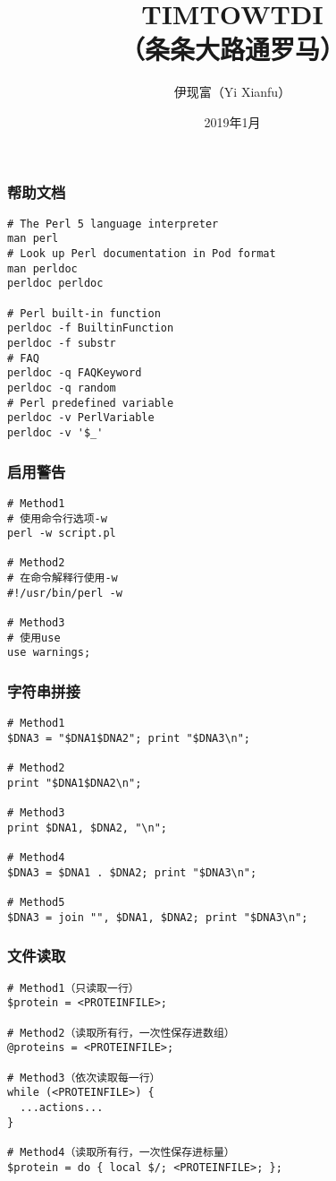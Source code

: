 


\title[TIMTOWTDI]{TIMTOWTDI\\（条条大路通罗马）}
\author[Yixf]{伊现富（Yi Xianfu）}
\date{2019年1月}

%
\begin{frame}
  \titlepage
\end{frame}

\begin{frame}[fragile]
  \frametitle{帮助文档}
  \vspace{-1.5em}
\begin{lstlisting}
# The Perl 5 language interpreter
man perl
# Look up Perl documentation in Pod format
man perldoc
perldoc perldoc

# Perl built-in function
perldoc -f BuiltinFunction
perldoc -f substr
# FAQ
perldoc -q FAQKeyword
perldoc -q random
# Perl predefined variable
perldoc -v PerlVariable
perldoc -v '$_'
\end{lstlisting}
\end{frame}

\begin{frame}[fragile]
  \frametitle{启用警告}
  \vspace{-1.5em}
\begin{lstlisting}
# Method1
# 使用命令行选项-w
perl -w script.pl

# Method2
# 在命令解释行使用-w
#!/usr/bin/perl -w

# Method3
# 使用use
use warnings;
\end{lstlisting}
\end{frame}

\begin{frame}[fragile]
  \frametitle{字符串拼接}
  \vspace{-1.5em}
\begin{lstlisting}
# Method1
$DNA3 = "$DNA1$DNA2"; print "$DNA3\n";

# Method2
print "$DNA1$DNA2\n";

# Method3
print $DNA1, $DNA2, "\n";

# Method4
$DNA3 = $DNA1 . $DNA2; print "$DNA3\n";

# Method5
$DNA3 = join "", $DNA1, $DNA2; print "$DNA3\n";
\end{lstlisting}
\end{frame}

\begin{frame}[fragile]
  \frametitle{文件读取}
  \vspace{-1.5em}
\begin{lstlisting}
# Method1（只读取一行）
$protein = <PROTEINFILE>;

# Method2（读取所有行，一次性保存进数组）
@proteins = <PROTEINFILE>;

# Method3（依次读取每一行）
while (<PROTEINFILE>) {
  ...actions...
}

# Method4（读取所有行，一次性保存进标量）
$protein = do { local $/; <PROTEINFILE>; };
\end{lstlisting}
\end{frame}

